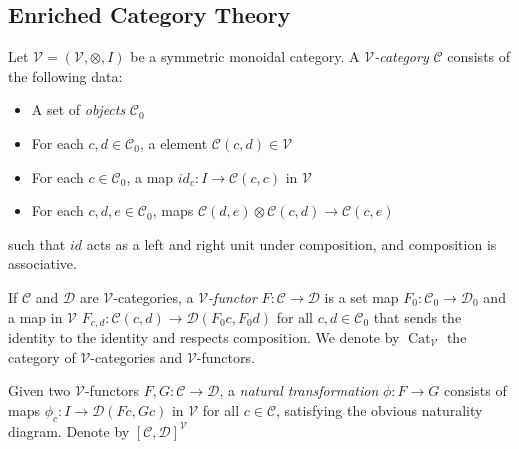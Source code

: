 \documentclass{report}
\DeclareMathOperator{\Cat}{Cat}
\renewcommand{\C}{\text{$\mathcal{C}$}}
\newcommand{\D}{\text{$\mathcal{D}$}}
\begin{document}
\begin{appendices}
  \chapter{Enriched Category Theory}
  \newcommand{\V}{\text{$\mathcal{V}$}}
  Let $\V = (\V,\otimes,I)$ be a symmetric monoidal category. A {\em $\V$-category} $\C$ consists of the following data:
  \begin{itemize}\itemsep-4pt
  \item A set of {\em objects} $\C_0$
  \item For each $c,d\in\C_0$, a element $\C(c,d)\in\V$
  \item For each $c\in\C_0$, a map $id_c:I\to\C(c,c)$ in $\V$
  \item For each $c,d,e\in\C_0$, maps $\C(d,e)\otimes\C(c,d)\to\C(c,e)$ 
  \end{itemize}
  such that $id$ acts as a left and right unit under composition, and composition is associative.

  If $\C$ and $\D$ are $\V$-categories, a {\em $\V$-functor} $F: \C\to\D$ is a set map $F_0: \C_0\to\D_0$ and a map in $\V$ $F_{c,d}: \C(c,d)\to\D(F_0c,F_0d)$ for all $c,d\in\C_0$ that sends the identity to the identity and respects composition. We denote by $\Cat_\V$ the category of $\V$-categories and $\V$-functors. 

  Given two $\V$-functors $F,G:\C\to\D$, a {\em natural transformation} $\phi: F\to G$ consists of maps $\phi_c: I\to\D(Fc,Gc)$ in $\V$ for all $c\in\C$, satisfying the obvious naturality diagram. Denote by $[\C,\D]^\V$




\end{appendices}
\end{document}

